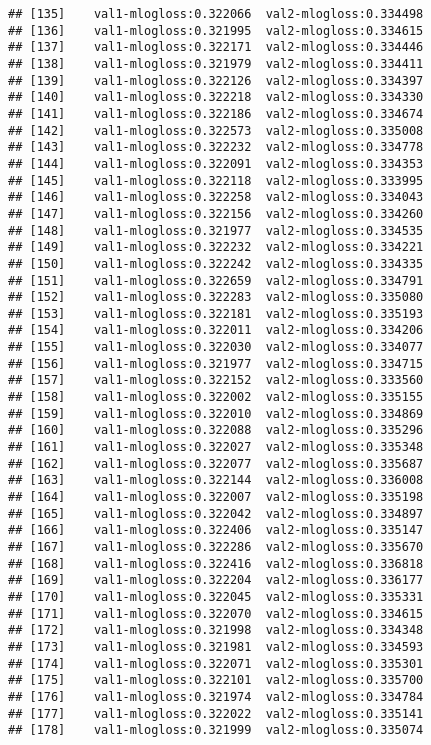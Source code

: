 \documentclass[]{article}
\begin{document}
\begin{verbatim}
## [135]    val1-mlogloss:0.322066  val2-mlogloss:0.334498 
## [136]    val1-mlogloss:0.321995  val2-mlogloss:0.334615 
## [137]    val1-mlogloss:0.322171  val2-mlogloss:0.334446 
## [138]    val1-mlogloss:0.321979  val2-mlogloss:0.334411 
## [139]    val1-mlogloss:0.322126  val2-mlogloss:0.334397 
## [140]    val1-mlogloss:0.322218  val2-mlogloss:0.334330 
## [141]    val1-mlogloss:0.322186  val2-mlogloss:0.334674 
## [142]    val1-mlogloss:0.322573  val2-mlogloss:0.335008 
## [143]    val1-mlogloss:0.322232  val2-mlogloss:0.334778 
## [144]    val1-mlogloss:0.322091  val2-mlogloss:0.334353 
## [145]    val1-mlogloss:0.322118  val2-mlogloss:0.333995 
## [146]    val1-mlogloss:0.322258  val2-mlogloss:0.334043 
## [147]    val1-mlogloss:0.322156  val2-mlogloss:0.334260 
## [148]    val1-mlogloss:0.321977  val2-mlogloss:0.334535 
## [149]    val1-mlogloss:0.322232  val2-mlogloss:0.334221 
## [150]    val1-mlogloss:0.322242  val2-mlogloss:0.334335 
## [151]    val1-mlogloss:0.322659  val2-mlogloss:0.334791 
## [152]    val1-mlogloss:0.322283  val2-mlogloss:0.335080 
## [153]    val1-mlogloss:0.322181  val2-mlogloss:0.335193 
## [154]    val1-mlogloss:0.322011  val2-mlogloss:0.334206 
## [155]    val1-mlogloss:0.322030  val2-mlogloss:0.334077 
## [156]    val1-mlogloss:0.321977  val2-mlogloss:0.334715 
## [157]    val1-mlogloss:0.322152  val2-mlogloss:0.333560 
## [158]    val1-mlogloss:0.322002  val2-mlogloss:0.335155 
## [159]    val1-mlogloss:0.322010  val2-mlogloss:0.334869 
## [160]    val1-mlogloss:0.322088  val2-mlogloss:0.335296 
## [161]    val1-mlogloss:0.322027  val2-mlogloss:0.335348 
## [162]    val1-mlogloss:0.322077  val2-mlogloss:0.335687 
## [163]    val1-mlogloss:0.322144  val2-mlogloss:0.336008 
## [164]    val1-mlogloss:0.322007  val2-mlogloss:0.335198 
## [165]    val1-mlogloss:0.322042  val2-mlogloss:0.334897 
## [166]    val1-mlogloss:0.322406  val2-mlogloss:0.335147 
## [167]    val1-mlogloss:0.322286  val2-mlogloss:0.335670 
## [168]    val1-mlogloss:0.322416  val2-mlogloss:0.336818 
## [169]    val1-mlogloss:0.322204  val2-mlogloss:0.336177 
## [170]    val1-mlogloss:0.322045  val2-mlogloss:0.335331 
## [171]    val1-mlogloss:0.322070  val2-mlogloss:0.334615 
## [172]    val1-mlogloss:0.321998  val2-mlogloss:0.334348 
## [173]    val1-mlogloss:0.321981  val2-mlogloss:0.334593 
## [174]    val1-mlogloss:0.322071  val2-mlogloss:0.335301 
## [175]    val1-mlogloss:0.322101  val2-mlogloss:0.335700 
## [176]    val1-mlogloss:0.321974  val2-mlogloss:0.334784 
## [177]    val1-mlogloss:0.322022  val2-mlogloss:0.335141 
## [178]    val1-mlogloss:0.321999  val2-mlogloss:0.335074 

\end{verbatim}
\end{document}
